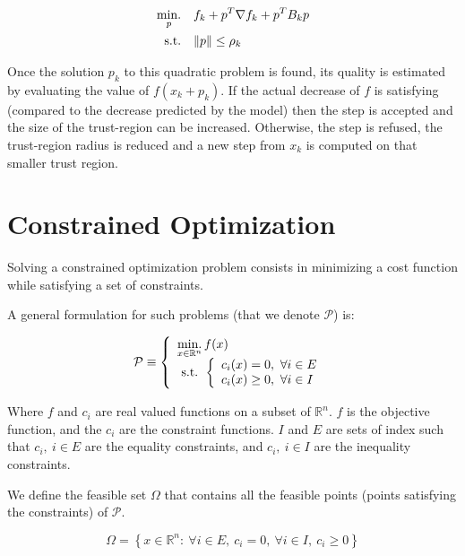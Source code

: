 \begin{align}
  \operatorname*{min.}_{p} & \quad f_k + p^T \nabla f_k + p^T B_k p \nonumber\\
\text{s.t.}&
\quad \|p\| \leq \rho_k
\label{eq:trustRegionNLP}
\end{align}

Once the solution $p_k$ to this quadratic problem is found, its quality is
estimated by evaluating the value of $f(x_k+p_k)$. If the actual decrease of $f$
is satisfying (compared to the decrease predicted by the model) then the step is
accepted and the size of the trust-region can be increased. Otherwise, the step
is refused, the trust-region radius is reduced and a new step from $x_k$ is
computed on that smaller trust region.

\section{Constrained Optimization}

Solving a constrained optimization problem consists in minimizing a cost function while satisfying a set of constraints.

A general formulation for such problems (that we denote $\mathcal{P}$) is:

\begin{equation}
  \label{formulation_NLCP}
  \mathcal{P} \equiv
  \left\{
  \begin{array}{l}
    \operatorname*{min.}\limits_{x\in\mathbb{R}^n}{f(x)}\\
    \text{ s.t. }
    \left\{
    \begin{array}{l}
      c_i(x) = 0,\ \forall i\in{E}\\
      c_i(x) \geq 0,\ \forall i\in{I}\\
    \end{array}
    \right.
  \end{array}
  \right.
\end{equation}

Where $f$ and $c_i$ are real valued functions on a subset of $\mathbb{R}^n$.
$f$ is the objective function, and the $c_i$ are the constraint functions.
${I}$ and ${E}$ are sets of index such that $c_i,\ i\in{E}$ are the equality constraints, and $c_i,\ i\in{I}$ are the inequality constraints.

We define the feasible set $\Omega$ that contains all the feasible points (points satisfying the constraints) of $\mathcal{P}$.

\begin{equation}
  \Omega = \left\{ x\in \mathbb{R}^n:\ \forall i\in {E},\ c_i=0,\ \forall i\in{I},\ c_i \geq0\right\}
\end{equation}

